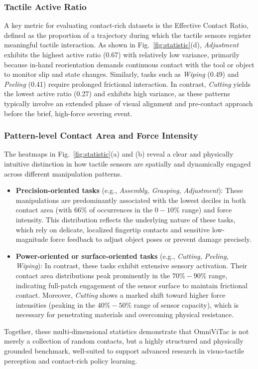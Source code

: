 \subsubsection{Tactile Active Ratio}

A key metric for evaluating contact-rich datasets is the Effective Contact Ratio, defined as the proportion of a trajectory during which the tactile sensors register meaningful tactile interaction. As shown in Fig.~\ref{fig:statistic}(d), \textit{Adjustment} exhibits the highest active ratio (0.67) with relatively low variance, primarily because in-hand reorientation demands continuous contact with the tool or object to monitor slip and state changes. Similarly, tasks such as \textit{Wiping} (0.49) and \textit{Peeling} (0.41) require prolonged frictional interaction. In contrast, \textit{Cutting} yields the lowest active ratio (0.27) and exhibits high variance, as these patterns typically involve an extended phase of visual alignment and pre-contact approach before the brief, high-force severing event.

\subsubsection{Pattern-level Contact Area and Force Intensity}

The heatmaps in Fig.~\ref{fig:statistic}(a) and (b) reveal a clear and physically intuitive distinction in how tactile sensors are spatially and dynamically engaged across different manipulation patterns.

\begin{itemize}
\item \textbf{Precision-oriented tasks} (e.g., \textit{Assembly, Grasping, Adjustment}): These manipulations are predominantly associated with the lowest deciles in both contact area (with $66\%$ of occurrences in the $0-10\%$ range) and force intensity. This distribution reflects the underlying nature of these tasks, which rely on delicate, localized fingertip contacts and sensitive low-magnitude force feedback to adjust object poses or prevent damage precisely.
\item \textbf{Power-oriented or surface-oriented tasks} (e.g., \textit{Cutting, Peeling, Wiping}): In contrast, these tasks exhibit extensive sensory activation. Their contact area distributions peak prominently in the $70\%-90\%$ range, indicating full-patch engagement of the sensor surface to maintain frictional contact. Moreover, \textit{Cutting} shows a marked shift toward higher force intensities (peaking in the $40\%-50\%$ range of sensor capacity), which is necessary for penetrating materials and overcoming physical resistance.
\end{itemize}

Together, these multi-dimensional statistics demonstrate that OmniViTac is not merely a collection of random contacts, but a highly structured and physically grounded benchmark, well-suited to support advanced research in visuo-tactile perception and contact-rich policy learning.